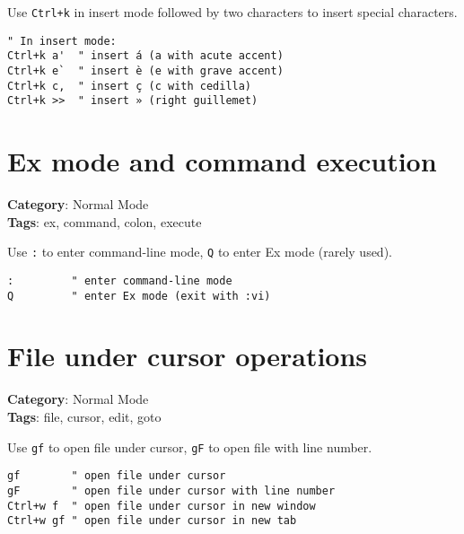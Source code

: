 {{{{{{{{{Use {\footnotesize \Verb§Ctrl+k§} in insert mode followed by two characters to insert special characters.

\begin{Exa*}{}
\begin{Verbatim}[fontsize=\footnotesize, breaklines, breakanywhere]
" In insert mode:
Ctrl+k a'  " insert á (a with acute accent)
Ctrl+k e`  " insert è (e with grave accent)
Ctrl+k c,  " insert ç (c with cedilla)
Ctrl+k >>  " insert » (right guillemet)
\end{Verbatim}
\end{Exa*}

\section{Ex mode and command execution}

\textbf{Category}: Normal Mode\\ \textbf{Tags}: ex, command, colon, execute
\vspace{0.5cm}

Use {\footnotesize \Verb§:§} to enter command-line mode, {\footnotesize \Verb§Q§} to enter Ex mode (rarely used).

\begin{Exa*}{}
\begin{Verbatim}[fontsize=\footnotesize, breaklines, breakanywhere]
:         " enter command-line mode
Q         " enter Ex mode (exit with :vi)
\end{Verbatim}
\end{Exa*}

\section{File under cursor operations}

\textbf{Category}: Normal Mode\\ \textbf{Tags}: file, cursor, edit, goto
\vspace{0.5cm}

Use {\footnotesize \Verb§gf§} to open file under cursor, {\footnotesize \Verb§gF§} to open file with line number.

\begin{Exa*}{}
\begin{Verbatim}[fontsize=\footnotesize, breaklines, breakanywhere]
gf        " open file under cursor
gF        " open file under cursor with line number
Ctrl+w f  " open file under cursor in new window
Ctrl+w gf " open file under cursor in new tab
\end{Verbatim}
\end{Exa*}

}}}}}}}}}
